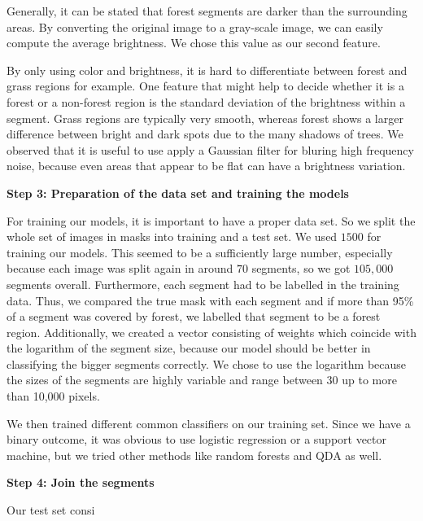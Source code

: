 Generally, it can be stated that forest segments are darker than the surrounding areas. By converting the original image to a gray-scale image, we can easily compute the average brightness. We chose this value as our second feature.

By only using color and brightness, it is hard to differentiate between forest and grass regions for example. One feature that might help to decide whether it is a forest or a non-forest region is the standard deviation of the brightness within a segment. Grass regions are typically very smooth, whereas forest shows a larger difference between bright and dark spots due to the many shadows of trees. We observed that it is useful to use apply a Gaussian filter for bluring high frequency noise, because even areas that appear to be flat can have a brightness variation.

\textbf{Step 3: Preparation of the data set and training the models}

For training our models, it is important to have a proper data set. So we split the whole set of images in masks into training and a test set. We used $1500$ for training our models. This seemed to be a sufficiently large number, especially because each image was split again in around $70$ segments, so we got $105,000$ segments overall. Furthermore, each segment had to be labelled in the training data. Thus, we compared the true mask with each segment and if more than 95\% of a segment was covered by forest, we labelled that segment to be a forest region. Additionally, we created a vector consisting of weights which coincide with the logarithm of the segment size, because our model should be better in classifying the bigger segments correctly. We chose to use the logarithm because the sizes of the segments are highly variable and range between 30 up to more than 10,000 pixels. 

We then trained different common classifiers on our training set. Since we have a binary outcome, it was obvious to use logistic regression or a support vector machine, but we tried other methods like random forests and QDA as well. 

\textbf{Step 4: Join the segments}

Our test set consi